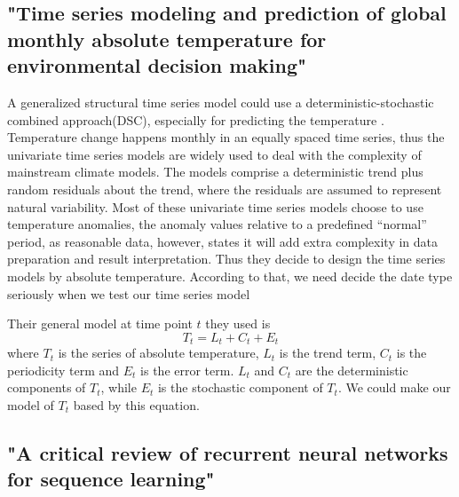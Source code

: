 \documentclass[conference]{IEEEtran}
\begin{document}
\subsection{"Time series modeling and prediction of global monthly absolute temperature for environmental decision making" \cite{yeTimeseriesModelingPrediction2013}}

A generalized structural time series model could use a deterministic-stochastic combined approach(DSC), especially for predicting the temperature \cite{yeTimeseriesModelingPrediction2013}. Temperature change happens monthly in an equally spaced time series, thus the univariate time series models are widely used to deal with the complexity of mainstream climate models. The models comprise a deterministic trend plus random residuals about the trend, where the residuals are assumed to represent natural variability. Most of these univariate time series models choose to use temperature anomalies, the anomaly values relative to a predefined “normal” period, as reasonable data, however, \cite{yeTimeseriesModelingPrediction2013} states it will add extra complexity in data preparation and result interpretation. Thus they decide to design the time series models by absolute temperature. According to that, we need decide the date type seriously when we test our time series model

Their general model at time point $t$ they used is 
$$T_t = L_t + C_t + E_t$$ 
where $T_t$ is the series of absolute temperature, $L_t$ is the trend term, $C_t$ is the periodicity term and $E_t$ is the error term. $L_t$ and $C_t$ are the deterministic components of $T_t$, while $E_t$ is the stochastic component of $T_t$. We could make our model of $T_t$ based by this equation. 


% 



\subsection{"A critical review of recurrent neural networks for sequence learning" \cite{liptonCriticalReviewRecurrent2015}}
\end{document}
